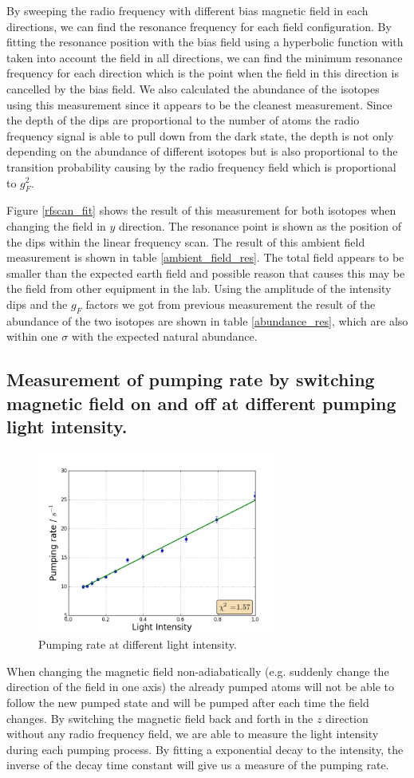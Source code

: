 \documentclass[aps,twocolumn,secnumarabic,balancelastpage,amsmath,amssymb,nofootinbib]{revtex4}
\begin{document}
By sweeping the radio frequency with different bias magnetic field in each directions, we can find the resonance frequency for each field configuration. By fitting the resonance position with the bias field using a hyperbolic function with taken into account the field in all directions, we can find the minimum resonance frequency for each direction which is the point when the field in this direction is cancelled by the bias field. We also calculated the abundance of the isotopes using this measurement since it appears to be the cleanest measurement. Since the depth of the dips are proportional to the number of atoms the radio frequency signal is able to pull down from the dark state, the depth is not only depending on the abundance of different isotopes but is also proportional to the transition probability causing by the radio frequency field which is proportional to $g_F^2$.

Figure \ref{rfscan_fit} shows the result of this measurement for both isotopes when changing the field in $y$ direction. The resonance point is shown as the position of the dips within the linear frequency scan. The result of this ambient field measurement is shown in table \ref{ambient_field_res}. The total field appears to be smaller than the expected earth field and possible reason that causes this may be the field from other equipment in the lab. Using the amplitude of the intensity dips and the $g_F$ factors we got from previous measurement the result of the abundance of the two isotopes are shown in table \ref{abundance_res}, which are also within one $\sigma$ with the expected natural abundance.

\subsection{Measurement of pumping rate by switching magnetic field on and off at different pumping light intensity.}
\begin{figure}
  \includegraphics[width=8cm]{../bswitch_nf/03-19-bswitch_nf_od_tau.png}
  \caption{Pumping rate at different light intensity.}
  \label{rate_fit}
\end{figure}
When changing the magnetic field non-adiabatically (e.g. suddenly change the direction of the field in one axis) the already pumped atoms will not be able to follow the new pumped state and will be pumped after each time the field changes. By switching the magnetic field back and forth in the $z$ direction without any radio frequency field, we are able to measure the light intensity during each pumping process. By fitting a exponential decay to the intensity, the inverse of the decay time constant will give us a measure of the pumping rate.
\end{document}
